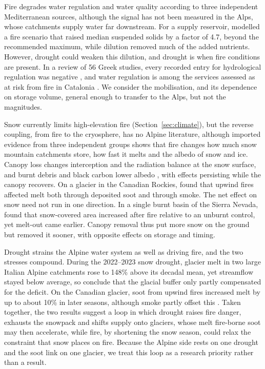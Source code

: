 \documentclass[11pt,a4paper]{article}
\begin{document}
Fire degrades water regulation and water quality according to three independent Mediterranean sources, although the signal has not been measured in the Alps, whose catchments supply water far downstream. For a supply reservoir, \citet{basso_potential_2021} modelled a fire scenario that raised median suspended solids by a factor of 4.7, beyond the recommended maximum, while dilution removed much of the added nutrients. However, drought could weaken this dilution, and drought is when fire conditions are present. In a review of 56 Greek studies, every recorded entry for hydrological regulation was negative \citep{misseyanni_impact_2025}, and water regulation is among the services assessed as at risk from fire in Catalonia \citep{lecinadiaz_assessing_2021}. We consider the mobilisation, and its dependence on storage volume, general enough to transfer to the Alps, but not the magnitudes.

Snow currently limits high-elevation fire (Section~\ref{sec:climate}), but the reverse coupling, from fire to the cryosphere, has no Alpine literature, although imported evidence from three independent groups shows that fire changes how much snow mountain catchments store, how fast it melts and the albedo of snow and ice. Canopy loss changes interception and the radiation balance at the snow surface, and burnt debris and black carbon lower albedo \citep{koshkin_wildfire_2022, pepin_climate_2022}, with effects persisting while the canopy recovers. On a glacier in the Canadian Rockies, \citet{aubrywake_fire_2022} found that upwind fires affected melt both through deposited soot and through smoke. The net effect on snow need not run in one direction. In a single burnt basin of the Sierra Nevada, \citet{micheletty_application_2014} found that snow-covered area increased after fire relative to an unburnt control, yet melt-out came earlier. Canopy removal thus put more snow on the ground but removed it sooner, with opposite effects on storage and timing.

Drought strains the Alpine water system as well as driving fire, and the two stresses compound. During the 2022--2023 snow drought, glacier melt in two large Italian Alpine catchments rose to 148\% above its decadal mean, yet streamflow stayed below average, so \citet{leone_20222023_2026} conclude that the glacial buffer only partly compensated for the deficit. On the Canadian glacier, soot from upwind fires increased melt by up to about 10\% in later seasons, although smoke partly offset this \citep{aubrywake_fire_2022}. Taken together, the two results suggest a loop in which drought raises fire danger, exhausts the snowpack and shifts supply onto glaciers, whose melt fire-borne soot may then accelerate, while fire, by shortening the snow season, could relax the constraint that snow places on fire. Because the Alpine side rests on one drought and the soot link on one glacier, we treat this loop as a research priority rather than a result.
\end{document}
